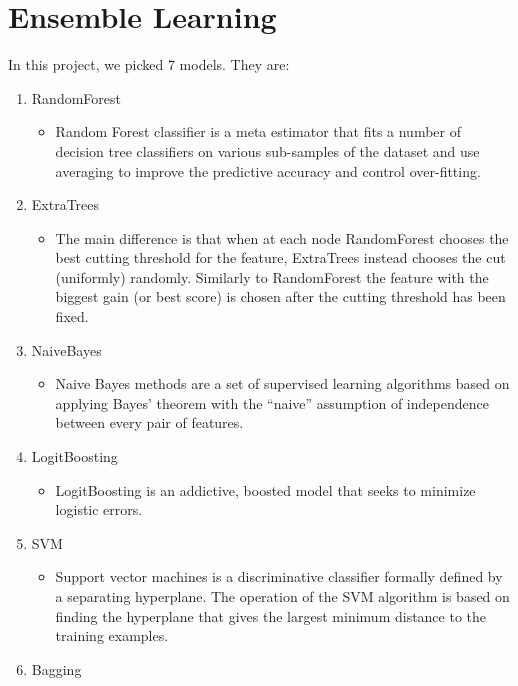\chapter{Ensemble Learning}
In this project, we picked 7 models. They are:
\begin{enumerate}
    \item RandomForest
        \begin{itemize}
            \item Random Forest classifier is a meta estimator that fits a number of decision tree classifiers on various sub-samples of the dataset and use averaging to improve the predictive accuracy and control over-fitting.
        \end{itemize}
    \item ExtraTrees
        \begin{itemize}
            \item  The main difference is that when at each node RandomForest chooses the best cutting threshold for the feature, ExtraTrees instead chooses the cut (uniformly) randomly. Similarly to RandomForest the feature with the biggest gain (or best score) is chosen after the cutting threshold has been fixed.
        \end{itemize}
    \item NaiveBayes
        \begin{itemize}
            \item Naive Bayes methods are a set of supervised learning algorithms based on applying Bayes’ theorem with the “naive” assumption of independence between every pair of features.
        \end{itemize}
    \item LogitBoosting
        \begin{itemize}
            \item LogitBoosting is an addictive, boosted model that seeks to minimize logistic errors.
        \end{itemize}
    \item SVM
        \begin{itemize}
            \item Support vector machines is a discriminative classifier formally defined by a separating hyperplane. The operation of the SVM algorithm is based on finding the hyperplane that gives the largest minimum distance to the training examples.
        \end{itemize}
    \item Bagging
        \begin{itemize}

\end{itemize}
\end{enumerate}
